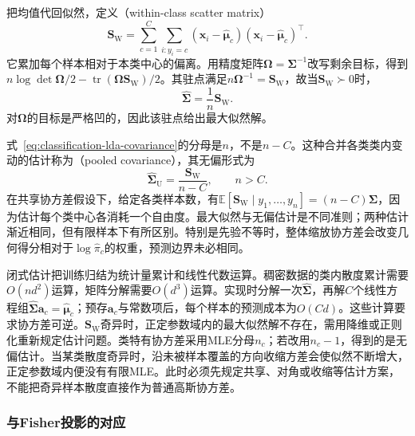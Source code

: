 把均值代回似然，定义（within-class scatter matrix）
\begin{equation}
  \label{eq:classification-lda-within}
  \bm{S}_{\mathrm{W}}
    =\sum_{c=1}^{C}\sum_{i:y_i=c}
      (\bm{x}_i-\hat{\bm{\mu}}_c)
      (\bm{x}_i-\hat{\bm{\mu}}_c)^{\top}.
\end{equation}
它累加每个样本相对于本类中心的偏离。用精度矩阵$\bm{\Omega}=\bm{\Sigma}^{-1}$改写剩余目标，得到$n\log\det\bm{\Omega}/2-\operatorname{tr}(\bm{\Omega}\bm{S}_{\mathrm{W}})/2$。其驻点满足$n\bm{\Omega}^{-1}=\bm{S}_{\mathrm{W}}$，故当$\bm{S}_{\mathrm{W}}\succ0$时，
\begin{equation}
  \label{eq:classification-lda-covariance}
  \hat{\bm{\Sigma}}=\frac1n\bm{S}_{\mathrm{W}} .
\end{equation}
对$\bm{\Omega}$的目标是严格凹的，因此该驻点给出最大似然解。

式~\eqref{eq:classification-lda-covariance}的分母是$n$，不是$n-C$。这种合并各类类内变动的估计称为（pooled covariance），其无偏形式为
\[
  \hat{\bm{\Sigma}}_{\mathrm{U}}
    =\frac{\bm{S}_{\mathrm{W}}}{n-C},\qquad n>C .
\]
在共享协方差假设下，给定各类样本数，有$\mathbb{E}[\bm{S}_{\mathrm{W}}\mid y_1,\ldots,y_n]=(n-C)\bm{\Sigma}$，因为估计每个类中心各消耗一个自由度。最大似然与无偏估计是不同准则；两种估计渐近相同，但有限样本下有所区别。特别是先验不等时，整体缩放协方差会改变几何得分相对于$\log\hat\pi_c$的权重，预测边界未必相同。

闭式估计把训练归结为统计量累计和线性代数运算。稠密数据的类内散度累计需要$O(nd^2)$运算，矩阵分解需要$O(d^3)$运算。实现时分解一次$\hat{\bm{\Sigma}}$，再解$C$个线性方程组$\hat{\bm{\Sigma}}\bm{a}_c=\hat{\bm{\mu}}_c$；预存$\bm{a}_c$与常数项后，每个样本的预测成本为$O(Cd)$。这些计算要求协方差可逆。$\bm{S}_{\mathrm{W}}$奇异时，正定参数域内的最大似然解不存在，需用降维或正则化重新规定估计问题。类特有协方差采用MLE分母$n_c$；若改用$n_c-1$，得到的是无偏估计。当某类散度奇异时，沿未被样本覆盖的方向收缩方差会使似然不断增大，正定参数域内便没有有限MLE。此时必须先规定共享、对角或收缩等估计方案，不能把奇异样本散度直接作为普通高斯协方差。

\subsubsection{与Fisher投影的对应}
\label{sec:classification-gda-fisher-relation}

